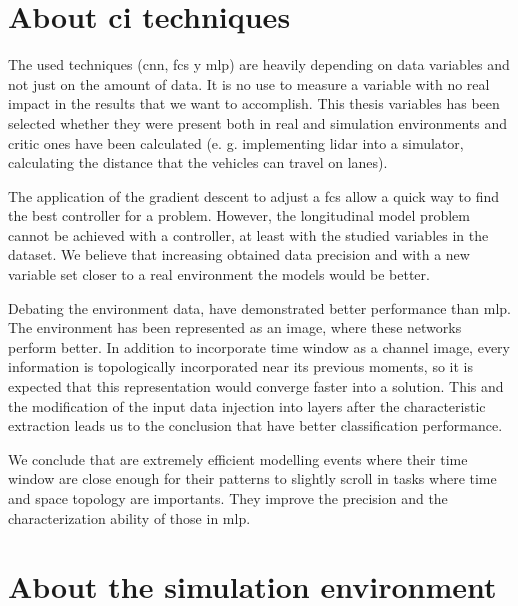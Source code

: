 \section{About \acrlong{ci} techniques}

The used techniques (\acrlong{cnn}, \acrlong{fcs} y \acrlong{mlp}) are heavily depending on data variables and not just on the amount of data. It is no use to measure a variable with no real impact in the results that we want to accomplish. This thesis variables has been selected whether they were present both in real and simulation environments and critic ones have been calculated (e. g. implementing \acrshort{lidar} into a simulator, calculating the distance that the vehicles can travel on lanes).

The application of the gradient descent to adjust a \acrlong{fcs} allow a quick way to find the best controller for a problem. However, the longitudinal model problem cannot be achieved with a controller, at least with the studied variables in the dataset. We believe that increasing obtained data precision and with a new variable set closer to a real environment the models would be better.

Debating the environment data,  have demonstrated better performance than \acrlong{mlp}. The environment has been represented as an image, where these networks perform better. In addition to incorporate time window as a channel image, every information is topologically incorporated near its previous moments, so it is expected that this representation would converge faster into a solution. This and the modification of the input data injection into layers after the characteristic extraction leads us to the conclusion that  have better classification performance.

We conclude that  are extremely efficient modelling events where their time window are close enough for their patterns to slightly scroll in tasks where time and space topology are importants. They improve the precision and the characterization ability of those in \acrlong{mlp}.

\section{About the simulation environment}

